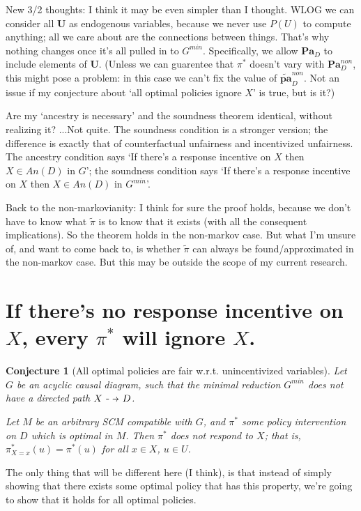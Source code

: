 \documentclass[letterpaper,10pt]{article}
\newtheorem{conjecture}{Conjecture}
\newcommand\dashto{\mathrel{
  -\mkern-6mu{\to}\mkern-20mu{\color{white}\bullet}\mkern12mu
}}
\begin{document}
New 3/2 thoughts: I think it may be even simpler than I thought. WLOG we can consider all $\mathbf{U}$ as endogenous variables, because we never use $P(U)$ to compute anything; all we care about are the connections between things.
That's why nothing changes once it's all pulled in to $G^{min}$.
Specifically, we allow $\mathbf{Pa}_D$ to include elements of $\mathbf{U}$. 
(Unless we can guarentee that $\pi^*$ doesn't vary with $\mathbf{Pa}_D^{non}$, this might pose a problem: in this case we can't fix the value of $\mathbf{\tilde{pa}}^{non}_D$. Not an issue if my conjecture about `all optimal policies ignore $X$' is true, but is it?)

Are my `ancestry is necessary' and the soundness theorem identical, without realizing it? ...Not quite. The soundness condition is a stronger version; the difference is exactly that of counterfactual unfairness and incentivized unfairness. 
The ancestry condition says `If there's a response incentive on $X$ then $X\in An(D)$ in $G$'; the soundness condition says `If there's a response incentive on $X$ then $X\in An(D)$ in $G^{min}$'.

Back to the non-markovianity: I think for sure the proof holds, because we don't have to know what $\tilde{\pi}$ is to know that it exists (with all the consequent implications). So the theorem holds in the non-markov case.
But what I'm unsure of, and want to come back to, \color{red} is whether $\tilde{\pi}$ can always be found/approximated in the non-markov case. \color{black} But this may be outside the scope of my current research.


\newpage
\section{If there's no response incentive on $X$, every $\pi^*$ will ignore $X$.}

\begin{conjecture}[All optimal policies are fair w.r.t. unincentivized variables]\label{allfair}
Let $G$ be an acyclic causal diagram, such that the minimal reduction $G^{min}$ does not have a directed path $X\dashto D$.

Let $M$ be an arbitrary SCM compatible with $G$, and $\pi^*$ some policy intervention on $D$ which is optimal in $M$.
Then $\pi^*$ does not respond to $X$; that is, $\pi^*_{X=x}(u)=\pi^*(u)$ for all $x\in X$, $u\in U$.
\end{conjecture}

The only thing that will be different here (I think), is that instead of simply showing that there exists some optimal policy that has this property, we're going to show that it holds for all optimal policies.
\end{document}
